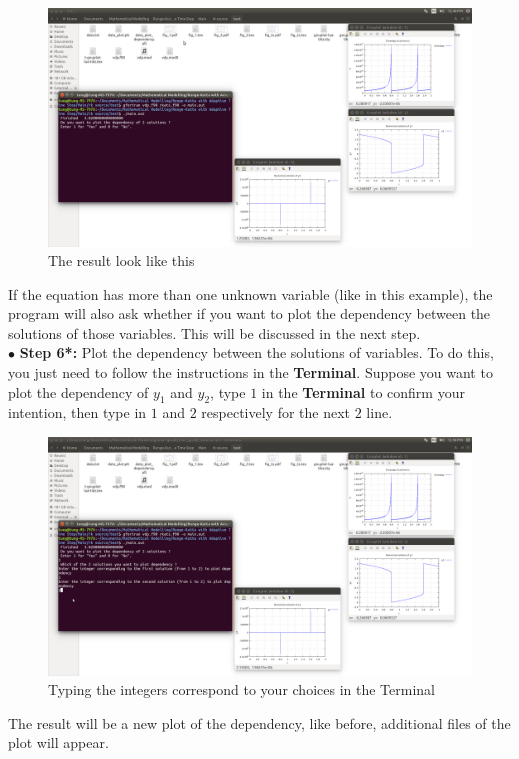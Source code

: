 \documentclass{article}
\begin{document}
	\begin{figure}[H]
		\centering	\includegraphics[width=15cm]{fig8}
		\caption{The result look like this}
	\end{figure}
	\noindent If the equation has more than one unknown variable (like in this example), the program will also ask whether if you want to plot the dependency between the solutions of those variables. This will be discussed in the next step.\\
	\noindent$\bullet$ \textbf{Step 6*:} Plot the dependency between the solutions of variables. To do this, you just need to follow the instructions in the \textbf{Terminal}. Suppose you want to plot the dependency of $y_1$ and $y_2$, type $1$ in the \textbf{Terminal} to confirm your intention, then type in $1$ and $2$ respectively for the next $2$ line.\\
	\begin{figure}[H]
		\centering	\includegraphics[width=15cm]{fig9}
		\caption{Typing the integers correspond to your choices in the Terminal}
	\end{figure}
	\noindent The result will be a new plot of the dependency, like before, additional files of the plot will appear.
\end{document}
